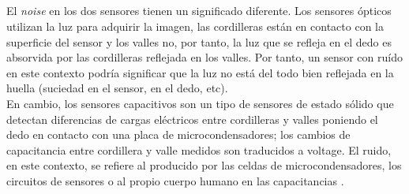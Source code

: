 \documentclass[10pt,a4paper]{article}
\begin{document}
\pagebreak

\subsection{}
El \textit{noise} en los dos sensores tienen un significado diferente. Los sensores ópticos utilizan la luz para adquirir la imagen, las cordilleras están en contacto con la superficie del sensor y los valles no, por tanto, la luz que se refleja en el dedo es absorvida por las cordilleras reflejada en los valles. Por tanto, un sensor con ruído en este contexto podría significar que la luz no está del todo bien reflejada en la huella (suciedad en el sensor, en el dedo, etc).\\
En cambio, los sensores capacitivos son un tipo de sensores de estado sólido que detectan diferencias de cargas eléctricos entre cordilleras y valles poniendo el dedo en contacto con una placa de microcondensadores; los cambios de capacitancia entre cordillera y valle medidos son traducidos a voltage. El ruido, en este contexto, se refiere al producido por las celdas de microcondensadores, los circuitos de sensores o al propio cuerpo humano en las capacitancias \cite{cmos}.\\
\end{document}
